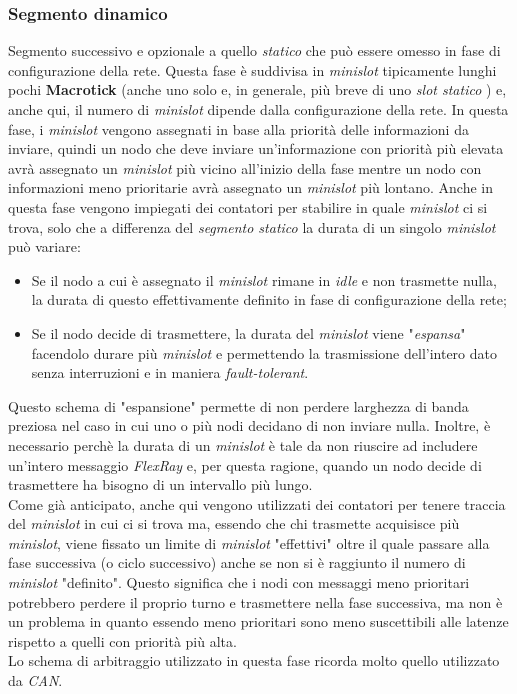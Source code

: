 \subsubsection{Segmento dinamico}
Segmento successivo e opzionale a quello \emph{statico} che può essere omesso in fase di configurazione della rete. Questa fase è suddivisa in \emph{minislot} tipicamente lunghi pochi \textbf{Macrotick} (anche uno solo e, in generale, più breve di uno \emph{slot statico} \cite{eos_flexray}) e, anche qui, il numero di \emph{minislot} dipende dalla configurazione della rete. In questa fase, i \emph{minislot} vengono assegnati in base alla priorità delle informazioni da inviare, quindi un nodo che deve inviare un'informazione con priorità più elevata avrà assegnato un \emph{minislot} più vicino all'inizio della fase mentre un nodo con informazioni meno prioritarie avrà assegnato un \emph{minislot} più lontano. Anche in questa fase vengono impiegati dei contatori per stabilire in quale \emph{minislot} ci si trova, solo che a differenza del \emph{segmento statico} la durata di un singolo \emph{minislot} può variare:
\begin{itemize}
    \item Se il nodo a cui è assegnato il \emph{minislot} rimane in \emph{idle} e non trasmette nulla, la durata di questo effettivamente definito in fase di configurazione della rete;
    \item Se il nodo decide di trasmettere, la durata del \emph{minislot} viene "\emph{espansa}" facendolo durare più \emph{minislot} e permettendo la trasmissione dell'intero dato senza interruzioni e in maniera \emph{fault-tolerant}.
\end{itemize}

Questo schema di "espansione" permette di non perdere larghezza di banda preziosa nel caso in cui uno o più nodi decidano di non inviare nulla. Inoltre, è necessario perchè la durata di un \emph{minislot} è tale da non riuscire ad includere un'intero messaggio \emph{FlexRay} e, per questa ragione, quando un nodo decide di trasmettere ha bisogno di un intervallo più lungo.\\
Come già anticipato, anche qui vengono utilizzati dei contatori per tenere traccia del \emph{minislot} in cui ci si trova ma, essendo che chi trasmette acquisisce più \emph{minislot}, viene fissato un limite di \emph{minislot} "effettivi" oltre il quale passare alla fase successiva (o ciclo successivo) anche se non si è raggiunto il numero di \emph{minislot} "definito". Questo significa che i nodi con messaggi meno prioritari potrebbero perdere il proprio turno e trasmettere nella fase successiva, ma non è un problema in quanto essendo meno prioritari sono meno suscettibili alle latenze rispetto a quelli con priorità più alta. \cite{eos_flexray} \cite{flexray_specification}\\
Lo schema di arbitraggio utilizzato in questa fase ricorda molto quello utilizzato da \emph{CAN}.


